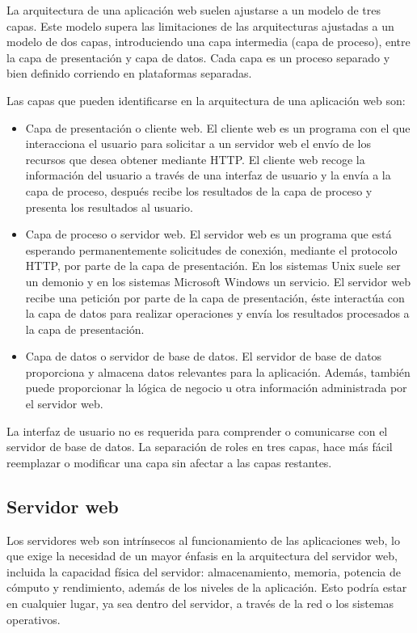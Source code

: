La arquitectura de una aplicación web suelen ajustarse a un modelo de tres capas. Este modelo supera las limitaciones de las arquitecturas ajustadas a un modelo de dos capas, introduciendo una capa intermedia (capa de proceso), entre la capa de presentación y  capa de datos. Cada capa es un proceso separado y bien definido corriendo en plataformas separadas.

Las capas que pueden identificarse en la arquitectura de una aplicación web son:

\begin{itemize}
  \item Capa de presentación o cliente web. El cliente web es un programa con el que interacciona el usuario para solicitar a un servidor web el envío de los recursos que desea obtener mediante HTTP. El cliente web recoge la información del usuario a través de una interfaz de usuario y la envía a la capa de proceso, después recibe los resultados de la capa de proceso y presenta los resultados al usuario.
  \item Capa de proceso o servidor web. El servidor web es un programa que está esperando permanentemente solicitudes de conexión, mediante el protocolo HTTP, por parte de la capa de presentación. En los sistemas Unix suele ser un demonio y en los sistemas Microsoft Windows un servicio. El servidor web recibe una petición por parte de la capa de presentación, éste interactúa con la capa de datos para realizar operaciones y envía los resultados procesados a la capa de presentación.
  \item Capa de datos o servidor de base de datos. El servidor de base de datos proporciona y almacena datos relevantes para la aplicación. Además, también puede proporcionar la lógica de negocio u otra información administrada por el servidor web.
\end{itemize}

La interfaz de usuario no es requerida para comprender o comunicarse con el servidor de base de datos. La separación de roles en tres capas, hace más fácil reemplazar o modificar una capa sin afectar a las capas restantes.

\subsection{Servidor web}

Los servidores web son intrínsecos al funcionamiento de las aplicaciones web, lo que exige la necesidad de un mayor énfasis en la arquitectura del servidor web, incluida la capacidad física del servidor: almacenamiento, memoria, potencia de cómputo y rendimiento, además de los niveles de la aplicación. Esto podría estar en cualquier lugar, ya sea dentro del servidor, a través de la red o los sistemas operativos.

